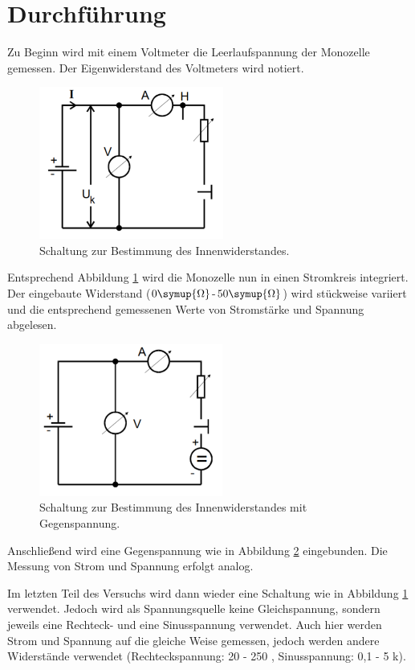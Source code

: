\section{Durchführung}
\label{sec:Durchführung}
Zu Beginn wird mit einem Voltmeter die Leerlaufspannung der Monozelle gemessen.
Der Eigenwiderstand des Voltmeters wird notiert.

\begin{figure}[H]
  \centering
  \includegraphics[height=5cm]{Schaltung.PNG}
  \caption{Schaltung zur Bestimmung des Innenwiderstandes. \cite{sample}}
  \label{fig:Schaltung}
\end{figure}

Entsprechend Abbildung \ref{fig:Schaltung} wird die Monozelle nun in einen
Stromkreis integriert. Der eingebaute Widerstand ($0 \symup{\Omega}$-$50 \symup{\Omega}$) wird stückweise variiert und
die entsprechend gemessenen Werte von Stromstärke und Spannung abgelesen.

\begin{figure}[H]
  \centering
  \includegraphics[height=5cm]{Schaltung1.PNG}
  \caption{Schaltung zur Bestimmung des Innenwiderstandes mit Gegenspannung. \cite{sample}}
  \label{fig:Schaltung1}
\end{figure}

Anschließend wird eine Gegenspannung wie in Abbildung \ref{fig:Schaltung1}
eingebunden. Die Messung von Strom und Spannung erfolgt analog.

Im letzten Teil des Versuchs wird dann wieder eine Schaltung wie in Abbildung  \ref{fig:Schaltung}
verwendet. Jedoch wird als Spannungsquelle keine Gleichspannung,
sondern jeweils eine Rechteck- und eine Sinusspannung verwendet. Auch hier werden
Strom und Spannung auf die gleiche Weise gemessen, jedoch werden andere Widerstände
verwendet (Rechteckspannung: 20 - 250 \Omega, Sinusspannung: 0,1 - 5 k\Omega).

